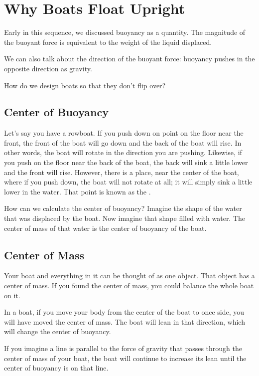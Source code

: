 \section{Why Boats Float Upright}

Early in this sequence, we discussed buoyancy as a quantity. The magnitude of the buoyant force is equivalent to the weight of the liquid displaced.

We can also talk about the direction of the buoyant force: buoyancy pushes in the opposite direction as gravity.

How do we design boats so that they don't flip over?

\subsection{Center of Buoyancy}

Let's say you have a rowboat. If you push down on point on the floor near the front, the front of the boat will go down and the back of the boat will rise. In other words, the boat will rotate in the direction you are pushing. 
Likewise, if you push on the floor near the back of the boat, the back will sink a little lower and the front will rise. However, there is a place, near the center of the boat, where if you push down, the boat will not rotate at all; it will simply sink a little lower
in the water. That point is known as the .


How can we calculate the center of buoyancy?  Imagine the shape of the water that was displaced by the boat. Now imagine that shape filled with water. The center of mass of that water is the center of buoyancy of the boat.

\subsection{Center of Mass}

Your boat and everything in it can be thought of as one object.  That object has a center of mass. If you found the center of mass, you could balance the whole boat on it.

In a boat,  if you move your body from the center of the boat to once side, you will have moved the center of mass. The boat will lean in that direction, which will change the center of buoyancy. 

If you imagine a line is parallel to the force of gravity that passes through the center of mass of your boat, the boat will continue to increase its lean until
the center of buoyancy is on that line.  

